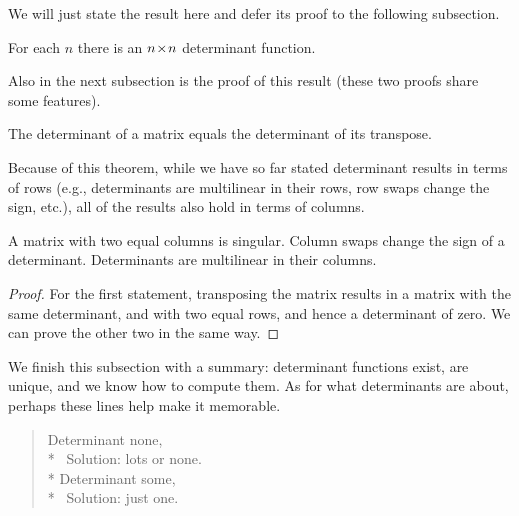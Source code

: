 We will just state the result here and 
defer its proof to the following subsection.


\begin{theorem}
 \label{th:DetsExist}
For each $n$ there is an $n \! \times \! n$ determinant function.
\end{theorem}

Also in the next subsection is the proof of this
result (these two proofs share some features).

\begin{theorem}
The determinant of a matrix equals the determinant of its transpose.
\end{theorem}

Because of this theorem,
while we have so far stated determinant results in terms of rows
(e.g., determinants are multilinear in their rows, row swaps change the
sign, etc.),
all of the results also hold in terms of columns.

\begin{corollary} \label{cor:ColSwapChgSign} \label{cor:DetsMultiInCols}
  A matrix with two equal columns is singular.
  Column swaps change the sign of a determinant.
  Determinants are multilinear in their columns.
\end{corollary}

\begin{proof}
For the first statement, 
transposing the matrix results in a matrix with the same determinant,
and with two equal rows, and hence a determinant of zero.
We can prove the other two in the same way.
\end{proof}

We finish this subsection with a summary:
determinant functions exist, are unique, and we know how to compute them.
As for what determinants are about, perhaps these lines
\cite{Kemp} help make it memorable.
\begin{verse} \small
Determinant none,         \\*
\ Solution: lots or none.   \\*
Determinant some,         \\*
\ Solution: just one.
\end{verse}




